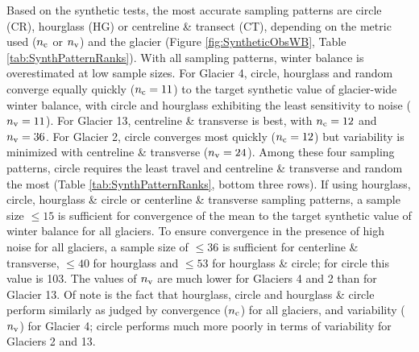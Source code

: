 \documentclass[twocolumn,letterpaper]{igs}
\begin{document}
Based on the synthetic tests, the most accurate sampling patterns are circle (CR), hourglass (HG) or centreline \& transect (CT), depending on the metric used ($n_{\rm c}$ or $n_{\rm v}$) and the glacier (Figure \ref{fig:SyntheticObsWB}, Table \ref{tab:SynthPatternRanks}). 
With all sampling patterns, winter balance is overestimated at low sample sizes.
For Glacier 4, circle, hourglass and random converge equally quickly ($n_{\rm c}=11$) to the target synthetic value of glacier-wide winter balance, with circle and hourglass exhibiting the least sensitivity to noise ($n_{\rm v}=11$). For Glacier 13, centreline \& transverse is best, with $n_{\rm c}=12$ and $n_{\rm v}=36$. For Glacier 2, circle converges most quickly ($n_{\rm c}=12$) but variability is minimized with centreline \& transverse ($n_{\rm v}=24$). Among these four sampling patterns, circle requires the least travel and centreline \& transverse and random the most (Table \ref{tab:SynthPatternRanks}, bottom three rows). 
If using hourglass, circle, hourglass \& circle or centerline \& transverse sampling patterns, a sample size $\leq 15$ is sufficient for convergence of the mean to the target synthetic value of winter balance for all glaciers. 
To ensure convergence in the presence of high noise for all glaciers, a sample size of  $\leq 36$ is sufficient for centerline \& transverse, $ \leq 40$ for hourglass and $\leq 53$ for hourglass \& circle; for circle this value is 103. 
The values of $n_{\rm v}$ are much lower for Glaciers 4 and 2 than for Glacier 13.   
Of note is the fact that hourglass, circle and hourglass \& circle perform similarly as judged by convergence ($n_{\rm c}$) for all glaciers, and variability ($n_{\rm v}$) for Glacier 4; circle performs much more poorly in terms of variability for Glaciers 2 and 13.
\end{document}
